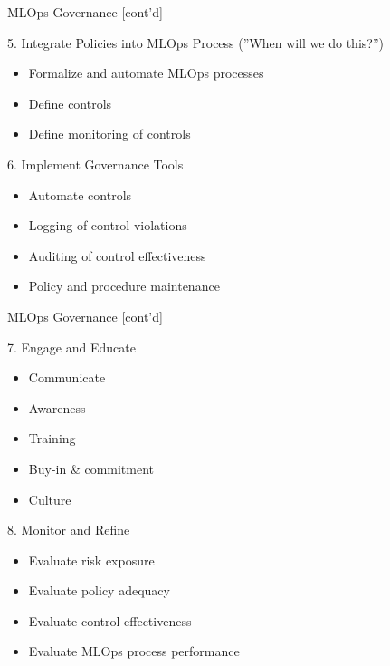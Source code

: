 \documentclass[ignorenonframetext,xcolor=x11names]{beamer}
\begin{document}
\begin{frame}{MLOps Governance \small [cont'd]}
\footnotesize
\begin{block}{5. Integrate Policies into MLOps Process (''When will we do this?'')}
\begin{itemize}
   \item Formalize and automate MLOps processes
   \item Define controls
   \item Define monitoring of controls
\end{itemize}
\end{block}

\begin{block}{6. Implement Governance Tools}
\begin{itemize}
   \item Automate controls
   \item Logging of control violations
   \item Auditing of control effectiveness
   \item Policy and procedure maintenance
\end{itemize}
\end{block}
\end{frame}

\begin{frame}{MLOps Governance \small [cont'd]}
\footnotesize
\begin{block}{7. Engage and Educate}
\begin{itemize}
   \item Communicate
   \item Awareness
   \item Training
   \item Buy-in \& commitment
   \item Culture
\end{itemize}
\end{block}

\begin{block}{8. Monitor and Refine}
\begin{itemize}
   \item Evaluate risk exposure
   \item Evaluate policy adequacy
   \item Evaluate control effectiveness
   \item Evaluate MLOps process performance
\end{itemize}
\end{block}
\end{frame}
\end{document}
